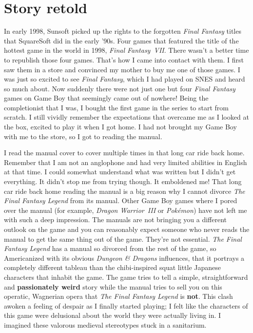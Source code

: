 \documentclass{book}
\begin{document}
\FloatBarrier\section*{Story retold}
In early 1998, Sunsoft picked up the rights to the forgotten \emph{Final Fantasy} titles that SquareSoft did in the early ’90s. Four games that featured the title of the hottest game in the world in 1998, \emph{Final Fantasy~VII}. There wasn’t a better time to republish those four games. That’s how I came into contact with them. I first saw them in a store and convinced my mother to buy me one of those games. I was just so excited to see \emph{Final Fantasy}, which I had played on SNES and heard so much about. Now suddenly there were not just one but four \emph{Final Fantasy} games on Game Boy that seemingly came out of nowhere! Being the completionist that I was, I bought the first game in the series to start from scratch. I still vividly remember the expectations that overcame me as I looked at the box, excited to play it when I got home. I had not brought my Game Boy with me to the store, so I got to reading the manual.\par
I read the manual cover to cover multiple times in that long car ride back home. Remember that I am not an anglophone and had very limited abilities in English at that time. I could somewhat understand what was written but I didn’t get everything. It didn’t stop me from trying though. It emboldened me! That long car ride back home reading the manual is a big reason why I cannot divorce \emph{The Final Fantasy Legend} from its manual. Other Game Boy games where I pored over the manual (for example, \emph{Dragon Warrior~III} or \emph{Pokémon}) have not left me with such a deep impression. The manuals are not bringing you a different outlook on the game and you can reasonably expect someone who never reads the manual to get the same thing out of the game. They’re not essential. \emph{The Final Fantasy Legend} has a manual so divorced from the rest of the game, so Americanized with its obvious \emph{Dungeon \& Dragons} influences, that it portrays a completely different tableau than the chibi-inspired squat little Japanese characters that inhabit the game. The game tries to tell a simple, straightforward and \textbf{passionately weird} story while the manual tries to sell you on this operatic, Wagnerian opera that \emph{The Final Fantasy Legend} is \textbf{not}. This clash awoken a feeling of despair as I finally started playing; I felt like the characters of this game were delusional about the world they were actually living in. I imagined these valorous medieval stereotypes stuck in a sanitarium.\par
\end{document}
